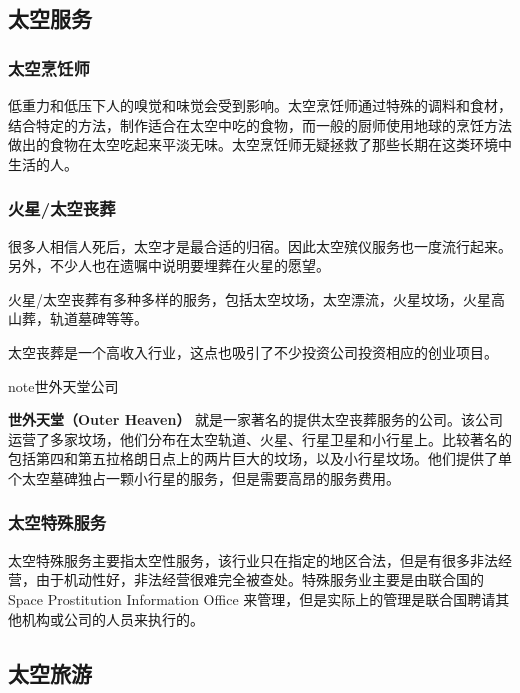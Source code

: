 \documentclass[letterpaper,10pt]{sphinxmanual}
\begin{document}
\subsection{太空服务}
\label{profession:id33}

\subsubsection{太空烹饪师}
\label{profession:id34}
低重力和低压下人的嗅觉和味觉会受到影响。太空烹饪师通过特殊的调料和食材，结合特定的方法，制作适合在太空中吃的食物，而一般的厨师使用地球的烹饪方法做出的食物在太空吃起来平淡无味。太空烹饪师无疑拯救了那些长期在这类环境中生活的人。


\subsubsection{火星/太空丧葬}
\label{profession:id35}
很多人相信人死后，太空才是最合适的归宿。因此太空殡仪服务也一度流行起来。另外，不少人也在遗嘱中说明要埋葬在火星的愿望。

火星/太空丧葬有多种多样的服务，包括太空坟场，太空漂流，火星坟场，火星高山葬，轨道墓碑等等。

太空丧葬是一个高收入行业，这点也吸引了不少投资公司投资相应的创业项目。

\begin{notice}{note}{世外天堂公司}

\textbf{世外天堂（Outer Heaven）} 就是一家著名的提供太空丧葬服务的公司。该公司运营了多家坟场，他们分布在太空轨道、火星、行星卫星和小行星上。比较著名的包括第四和第五拉格朗日点上的两片巨大的坟场，以及小行星坟场。他们提供了单个太空墓碑独占一颗小行星的服务，但是需要高昂的服务费用。
\end{notice}


\subsubsection{太空特殊服务}
\label{profession:id36}
太空特殊服务主要指太空性服务，该行业只在指定的地区合法，但是有很多非法经营，由于机动性好，非法经营很难完全被查处。特殊服务业主要是由联合国的 Space Prostitution Information Office 来管理，但是实际上的管理是联合国聘请其他机构或公司的人员来执行的。


\subsection{太空旅游}
\label{profession:id37}
\end{document}
